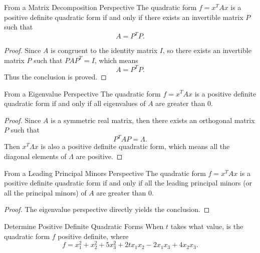 \begin{corollary}{From a Matrix Decomposition Perspective}{}
  The quadratic form $f = x^TAx$ is a positive definite quadratic form if and only if there exists
  an invertible matrix $P$ such that
  \begin{equation}
    A = P^TP.
  \end{equation}
\end{corollary}

\begin{proof}
  Since $A$ is congruent to the identity matrix $I$,
  so there exists an invertible matrix $P$ such that $PAP^T = I$, which means
  \begin{equation}
    A = P^TP.
  \end{equation}
  Thus the conclusion is proved.
\end{proof}

\begin{proposition}{From a Eigenvalue Perspective}{}
  The quadratic form $f = x^TAx$ is a positive definite quadratic form if and
  only if all eigenvalues of $A$ are greater than $0$.
\end{proposition}

\begin{proof}
  Since $A$ is a symmetric real matrix, then there exists an orthogonal matrix
  $P$ such that
  \begin{equation}
    P^TAP = \Lambda.
  \end{equation}
  Then $x^T\Lambda x$ is also a positive definite quadratic form, which means
  all the diagonal elements of $\Lambda$ are positive.
\end{proof}

\begin{corollary}{From a Leading Principal Minors Perspective}{}
  The quadratic form $f = x^TAx$ is a positive definite quadratic form if and
  only if all the leading principal minors (or all the principal minors) of $A$
  are greater than $0$.
\end{corollary}

\begin{proof}
  The eigenvalue perspective directly yields the conclusion.
\end{proof}

\begin{example}{Determine Positive Definite Quadratic Forms}{}
  When $t$ takes what value, is the quadratic form $f$ positive definite, where
  \begin{equation}
    f = x_1^2 + x_2^2 + 5x_3^2 + 2tx_1x_2 - 2x_1x_3 + 4x_2x_3.
  \end{equation}
\end{example}

